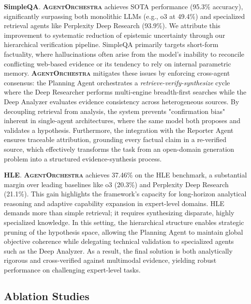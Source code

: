 \documentclass[11pt]{article}
\newcommand{\projectname}{\textbf{\textsc{AgentOrchestra}}\xspace}
\begin{document}
\textbf{SimpleQA}. \projectname achieves SOTA performance (95.3\% accuracy), significantly surpassing both monolithic LLMs (e.g., o3 at 49.4\%) and specialized retrieval agents like Perplexity Deep Research (93.9\%). We attribute this improvement to systematic reduction of epistemic uncertainty through our hierarchical verification pipeline. SimpleQA primarily targets short-form factuality, where hallucinations often arise from the model's inability to reconcile conflicting web-based evidence or its tendency to rely on internal parametric memory. \projectname mitigates these issues by enforcing cross-agent consensus: the Planning Agent orchestrates a \textit{retrieve-verify-synthesize} cycle where the Deep Researcher performs multi-engine breadth-first searches while the Deep Analyzer evaluates evidence consistency across heterogeneous sources. By decoupling retrieval from analysis, the system prevents "confirmation bias" inherent in single-agent architectures, where the same model both proposes and validates a hypothesis. Furthermore, the integration with the Reporter Agent ensures traceable attribution, grounding every factual claim in a re-verified source, which effectively transforms the task from an open-domain generation problem into a structured evidence-synthesis process.

\textbf{HLE}. \projectname achieves 37.46\% on the HLE benchmark, a substantial margin over leading baselines like o3 (20.3\%) and Perplexity Deep Research (21.1\%). This gain highlights the framework's capacity for long-horizon analytical reasoning and adaptive capability expansion in expert-level domains. HLE demands more than simple retrieval; it requires synthesizing disparate, highly specialized knowledge. In this setting, the hierarchical structure enables strategic pruning of the hypothesis space, allowing the Planning Agent to maintain global objective coherence while delegating technical validation to specialized agents such as the Deep Analyzer. As a result, the final solution is both analytically rigorous and cross-verified against multimodal evidence, yielding robust performance on challenging expert-level tasks.

\subsection{Ablation Studies}
\end{document}
